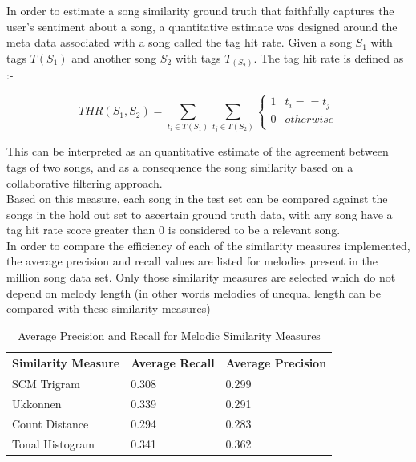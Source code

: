 \noindent In order to estimate a song similarity ground truth that faithfully captures the user's sentiment about a song, a quantitative estimate was designed around the meta data associated with a song called the tag hit rate. Given a song $S_1$ with tags $T(S_1)$ and another song $S_2$ with tags $T_(S_2)$. The tag hit rate is defined as :-

\begin{equation} \label{taghitrate}
THR(S_1, S_2) = \sum_{t_i \in T(S_1)} \sum_{t_j \in T(S_2)} \begin{cases} 
      1 & t_i == t_j \\
      0 & otherwise \\  \end{cases}
\end{equation}

\noindent This can be interpreted as an quantitative estimate of the agreement between tags of two songs, and as a consequence the song similarity based on a collaborative filtering approach. \\

\noindent Based on this measure, each song in the test set can be compared against the songs in the hold out set to ascertain ground truth data, with any song have a tag hit rate score greater than 0 is considered to be a relevant song. \\

\noindent In order to compare the efficiency of each of the similarity measures implemented, the average precision and recall values are listed for melodies present in the million song data set. Only those similarity measures are selected which do not depend on melody length (in other words melodies of unequal length can be compared with these similarity measures) \\

\begin{table}[h]
\begin{center}
    \begin{tabular}{| l | l | l |}
    \hline
    Similarity Measure & Average Recall & Average Precision \\ \hline
    SCM Trigram & 0.308 & 0.299 \\ \hline
    Ukkonnen & 0.339 & 0.291 \\ \hline
    Count Distance & 0.294 & 0.283  \\ \hline
    Tonal Histogram & 0.341 & 0.362  \\ \hline
    \end{tabular}
\end{center}
\caption{Average Precision and Recall for Melodic Similarity Measures}
\end{table}


